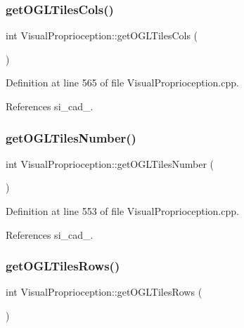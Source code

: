 \subsubsection{\texorpdfstring{get\+O\+G\+L\+Tiles\+Cols()}{getOGLTilesCols()}}
{\footnotesize\ttfamily int Visual\+Proprioception\+::get\+O\+G\+L\+Tiles\+Cols (\begin{DoxyParamCaption}{ }\end{DoxyParamCaption})}



Definition at line 565 of file Visual\+Proprioception.\+cpp.



References si\+\_\+cad\+\_\+.

\mbox{\label{classVisualProprioception_a0b3a18baa3f51b4c88155c87ab48759a}} 
\subsubsection{\texorpdfstring{get\+O\+G\+L\+Tiles\+Number()}{getOGLTilesNumber()}}
{\footnotesize\ttfamily int Visual\+Proprioception\+::get\+O\+G\+L\+Tiles\+Number (\begin{DoxyParamCaption}{ }\end{DoxyParamCaption})}



Definition at line 553 of file Visual\+Proprioception.\+cpp.



References si\+\_\+cad\+\_\+.

\mbox{\label{classVisualProprioception_ac0f57686b122f7ab867d9715281692a2}} 
\subsubsection{\texorpdfstring{get\+O\+G\+L\+Tiles\+Rows()}{getOGLTilesRows()}}
{\footnotesize\ttfamily int Visual\+Proprioception\+::get\+O\+G\+L\+Tiles\+Rows (\begin{DoxyParamCaption}{ }\end{DoxyParamCaption})}



